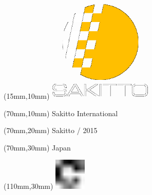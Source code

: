 \null\newpage
\begin{textblock*}{50mm}(15mm,10mm)%
\includegraphics[width=50mm]{LG/SAK.png}
\end{textblock*}
\begin{textblock*}{130mm}(70mm,10mm)%
{\fontsize{20}{20}\selectfont Sakitto International}\\
\end{textblock*}
\begin{textblock*}{120mm}(70mm,20mm)%
{\fontsize{16}{16}\selectfont Sakitto / 2015}\\
\end{textblock*}
\begin{textblock*}{120mm}(70mm,30mm)%
{\fontsize{12}{12}\selectfont Japan}
\end{textblock*}
\begin{textblock*}{30mm}(110mm,30mm)%
\centering
\includegraphics[height=15mm]{icons/fa-rotate-right.pdf}
\end{textblock*}
